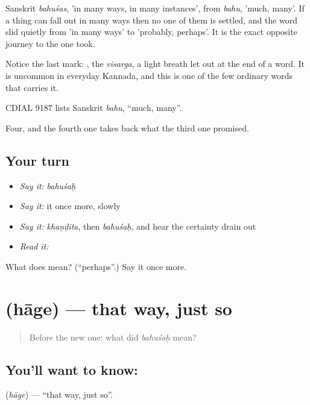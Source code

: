 Sanskrit \emph{bahuśas}, 'in many ways, in many instances', from \emph{bahu}, 'much, many'. If a thing can fall out in many ways then no one of them is settled, and the word slid quietly from 'in many ways' to 'probably, perhaps'. It is the exact opposite journey to the one  took.

Notice the last mark: , the \emph{visarga}, a light breath let out at the end of a word. It is uncommon in everyday Kannada, and this is one of the few ordinary words that carries it.

CDIAL 9187 lists Sanskrit \emph{bahu}, \textquotedblleft{}much, many\textquotedblright{}.

\begin{grammarlens}[title={What you've built}]
Four, and the fourth one takes back what the third one promised.
\end{grammarlens}

\subsection*{Your turn}
\begin{itemize}
\raggedright
  \item \emph{Say it:} \emph{bahuśaḥ}
  \item \emph{Say it:} it once more, slowly
  \item \emph{Say it:} \emph{khaṇḍita}, then \emph{bahuśaḥ}, and hear the certainty drain out
  \item \emph{Read it:} \textbf{}
\end{itemize}

\begin{tcolorbox}[breakable,colback=teal!4,colframe=teal!35!black,title={Before you move on}]
What does  mean? (\textquotedblleft{}perhaps\textquotedblright{}.) Say it once more.
\end{tcolorbox}
\section[\texorpdfstring{\kn{ಹಾಗೆ} (hāge)}{ಹಾಗೆ (hāge)}]{ (hāge) — that way, just so}

\label{lesson:KA-C49-just-so}



\begin{quote}
Before the new one: what did \emph{bahuśaḥ} mean?
\end{quote}

\subsection*{You'll want to know: }
\textbf{} (\emph{hāge}) — \textquotedblleft{}that way, just so\textquotedblright{}.

